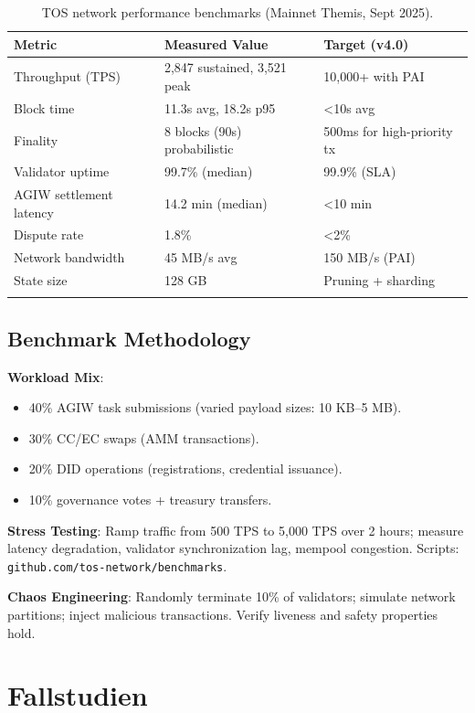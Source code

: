 \documentclass[11pt]{article}
\begin{document}
\begin{longtable}{@{}p{}p{}p{}@{}}
\toprule
\textbf{Metric} & \textbf{Measured Value} & \textbf{Target (v4.0)} \\\midrule
Throughput (TPS) & 2,847 sustained, 3,521 peak & 10,000+ with PAI \\
Block time & 11.3s avg, 18.2s p95 & <10s avg \\
Finality & 8 blocks (90s) probabilistic & 500ms for high-priority tx \\
Validator uptime & 99.7\% (median) & 99.9\% (SLA) \\
AGIW settlement latency & 14.2 min (median) & <10 min \\
Dispute rate & 1.8\% & <2\% \\
Network bandwidth & 45 MB/s avg & 150 MB/s (PAI) \\
State size & 128 GB & Pruning + sharding \\
\bottomrule
\caption{TOS network performance benchmarks (Mainnet Themis, Sept 2025).}
\end{longtable}

\subsection{Benchmark Methodology}

\textbf{Workload Mix}:
\begin{itemize}[noitemsep]
  \item 40\% AGIW task submissions (varied payload sizes: 10 KB--5 MB).
  \item 30\% CC/EC swaps (AMM transactions).
  \item 20\% DID operations (registrations, credential issuance).
  \item 10\% governance votes + treasury transfers.
\end{itemize}

\textbf{Stress Testing}: Ramp traffic from 500 TPS to 5,000 TPS over 2 hours; measure latency degradation, validator synchronization lag, mempool congestion. Scripts: \texttt{github.com/tos-network/benchmarks}.

\textbf{Chaos Engineering}: Randomly terminate 10\% of validators; simulate network partitions; inject malicious transactions. Verify liveness and safety properties hold.

\section{Fallstudien}
\label{sec:case-studies}
\end{document}
